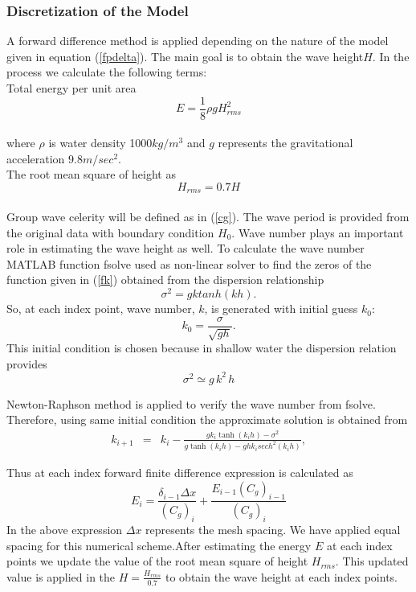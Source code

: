 \subsubsection{Discretization of the Model}
A forward difference method is applied depending on the nature of the model given in equation (\ref{fpdelta}). The main goal is to obtain the wave height${H}$. In the process we calculate the following terms:\\
Total energy per unit area
$${E=\frac{1}{8}\rho g H_{rms}^2}$$\\
where ${\rho}$ is water density 1000${kg/m^3}$ and ${g}$ represents the gravitational acceleration ${9.8m/sec^2}$. \\
The root mean square of height as\\
$${H_{rms}=0.7 H}$$\\
Group wave celerity will be defined as in  (\ref{cg}). The wave period is provided from the original data with boundary condition ${H_{0}}$. 
Wave number plays an important role in estimating the wave height as well. To calculate the wave number MATLAB function fsolve used as non-linear solver to find the zeros of the function given in (\ref{fk}) obtained from the dispersion relationship
$$
\sigma^{2}=gk tanh(kh).
$$ 
So, at each index point, wave number, $k$, is generated with initial guess $k_0$:
$$k_0=\frac{\sigma}{\sqrt{gh}}.$$
This initial condition is chosen because in shallow water the dispersion relation provides \\
$${\sigma^2\simeq g\,k^2\,h}$$

Newton-Raphson method is applied to verify the wave number from fsolve. Therefore, using same initial condition the approximate solution is obtained from
\begin{eqnarray}
k_{i+1}& =& k_{i}-\frac{gk_i\tanh(k_ih)-\sigma^2}{g\tanh(k_ih)-ghk_i sech^2(k_ih)},
\end{eqnarray}

Thus at each index forward finite difference expression is calculated as
$$E_{i}=\frac{\delta_{i-1}\Delta x}{(C_g)_{i}}+\frac{E_{i-1}(C_g)_{i-1}}{(C_g)_{i}}$$
In the above expression ${\Delta x}$ represents the mesh spacing. We have applied equal spacing for this numerical scheme.After estimating the energy ${E}$ at each index points we update the value of the root mean square of height ${H_{rms}}$. This updated value is applied in the ${H=\frac{H_{rms}}{0.7}}$ to obtain the wave height at each index points. 


